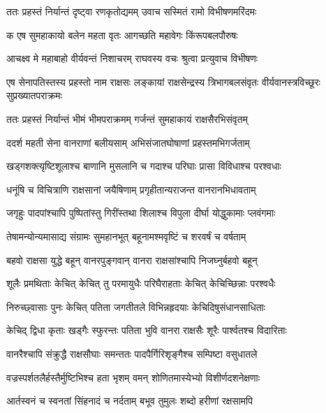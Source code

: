 
\twolineshloka
{ततः प्रहस्तं निर्यान्तं दृष्ट्वा रणकृतोद्यमम्}
{उवाच सस्मितं रामो विभीषणमरिंदमः} %

\twolineshloka
{क एष सुमहाकायो बलेन महता वृतः}
{आगच्छति महावेगः किंरूपबलपौरुषः} %

\twolineshloka
{आचक्ष्व मे महाबाहो वीर्यवन्तं निशाचरम्}
{राघवस्य वचः श्रुत्वा प्रत्युवाच विभीषणः} %

\threelineshloka
{एष सेनापतिस्तस्य प्रहस्तो नाम राक्षसः}
{लङ्कायां राक्षसेन्द्रस्य त्रिभागबलसंवृतः}
{वीर्यवानस्त्रविच्छूरः सुप्रख्यातपराक्रमः} %

\twolineshloka
{ततः प्रहस्तं निर्यान्तं भीमं भीमपराक्रमम्}
{गर्जन्तं सुमहाकायं राक्षसैरभिसंवृतम्} %

\twolineshloka
{ददर्श महती सेना वानराणां बलीयसाम्}
{अभिसंजातघोषाणां प्रहस्तमभिगर्जताम्} %

\twolineshloka
{खड्गशक्त्यृष्टिशूलाश्च बाणानि मुसलानि च}
{गदाश्च परिघाः प्रासा विविधाश्च परश्वधाः} %

\twolineshloka
{धनूंषि च विचित्राणि राक्षसानां जयैषिणाम्}
{प्रगृहीतान्यराजन्त वानरानभिधावताम्} %

\twolineshloka
{जगृहुः पादपांश्चापि पुष्पितांस्तु गिरींस्तथा}
{शिलाश्च विपुला दीर्घा योद्धुकामाः प्लवंगमाः} %

\twolineshloka
{तेषामन्योन्यमासाद्य संग्रामः सुमहानभूत्}
{बहूनामश्मवृष्टिं च शरवर्षं च वर्षताम्} %

\twolineshloka
{बहवो राक्षसा युद्धे बहून् वानरपुङ्गवान्}
{वानरा राक्षसांश्चापि निजघ्नुर्बहवो बहून्} %

\twolineshloka
{शूलैः प्रमथिताः केचित् केचित् तु परमायुधैः}
{परिघैराहताः केचित् केचिच्छिन्नाः परश्वधैः} %

\twolineshloka
{निरुच्छ्वासाः पुनः केचित् पतिता जगतीतले}
{विभिन्नहृदयाः केचिदिषुसंधानसाधिताः} %

\twolineshloka
{केचिद् द्विधा कृताः खड्गैः स्फुरन्तः पतिता भुवि}
{वानरा राक्षसैः शूरैः पार्श्वतश्च विदारिताः} %

\twolineshloka
{वानरैश्चापि संक्रुद्धै राक्षसौघाः समन्ततः}
{पादपैर्गिरिशृङ्गैश्च सम्पिष्टा वसुधातले} %

\twolineshloka
{वज्रस्पर्शतलैर्हस्तैर्मुष्टिभिश्च हता भृशम्}
{वमन् शोणितमास्येभ्यो विशीर्णदशनेक्षणाः} %

\twolineshloka
{आर्तस्वनं च स्वनतां सिंहनादं च नर्दताम्}
{बभूव तुमुलः शब्दो हरीणां रक्षसामपि} %

